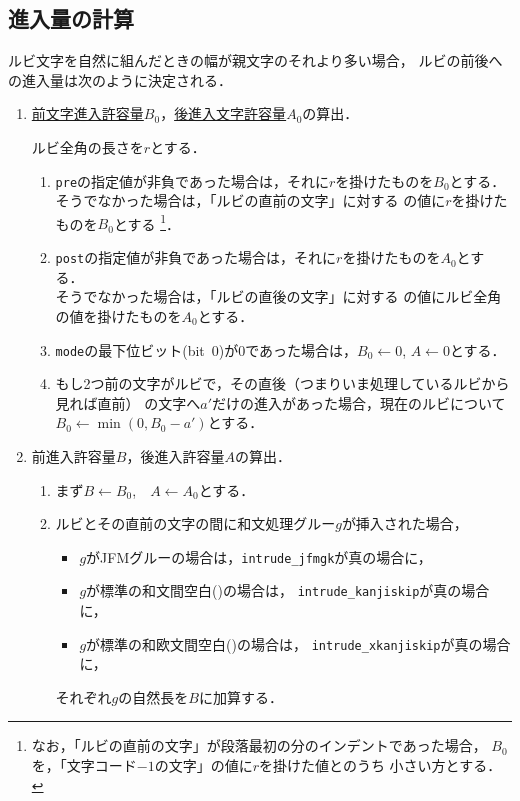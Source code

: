 \documentclass[a4paper,10ptj]{ltjsarticle}
\def\emph#1{\textbf{\textgt{#1}}}
\def\cs#1{\eghostguarded{\texttt{\textbackslash#1}}}
\begin{document}
\subsection{進入量の計算}
\label{ssec:calc_intrusion}
ルビ文字を自然に組んだときの幅が親文字のそれより多い場合，
ルビの前後への進入量は次のように決定される．
\begin{enumerate}[label=\emph{Step~\arabic*},labelindent=0pt,itemindent=*,itemsep=\medskipamount]
  \item \underline{前文字進入許容量}$B_0$，\underline{後進入文字許容量}$A_0$の算出．
  
  ルビ全角の長さを$r$とする．
  \begin{enumerate}
   \item \texttt{pre}の指定値が非負であった場合は，それに$r$を掛けたものを$B_0$とする．\\
    そうでなかった場合は，「ルビの直前の文字」に対する
    の値に$r$を掛けたものを$B_0$とする
    \footnote{%
      なお，「ルビの直前の文字」が段落最初の\cs{parindent}分のインデントであった場合，
      $B_0$を，「文字コード$-1$の文字」の値に$r$を掛けた値と\cs{parindent}のうち
      小さい方とする．
    }．
   \item \texttt{post}の指定値が非負であった場合は，それに$r$を掛けたものを$A_0$とする．\\
    そうでなかった場合は，「ルビの直後の文字」に対する
    の値にルビ全角の値を掛けたものを$A_0$とする．
   \item \texttt{mode}の最下位ビット(bit~0)が0であった場合は，$B_0\leftarrow 0$, $A\leftarrow 0$とする．
   \item もし2つ前の文字がルビで，その直後（つまりいま処理しているルビから見れば直前）
    の文字へ$a'$だけの進入があった場合，現在のルビについて$B_0←\min(0,B_0-a')$とする．
  \end{enumerate}
  \item 前進入許容量$B$，後進入許容量$A$の算出．
  \begin{enumerate}
    \item まず$B\leftarrow B_0$,\ \ $A\leftarrow A_0$とする．
    \item ルビとその直前の文字の間に和文処理グルー$g$が挿入された場合，
    \begin{itemize}
      \item $g$がJFMグルーの場合は，\texttt{intrude\_jfmgk}が真の場合に，
      \item $g$が標準の和文間空白()の場合は，
      \texttt{intrude\_kanjiskip}が真の場合に，
      \item $g$が標準の和欧文間空白()の場合は，
      \texttt{intrude\_xkanjiskip}が真の場合に，
    \end{itemize}
    それぞれ$g$の自然長を$B$に加算する．


\end{enumerate}
\end{enumerate}
\end{document}
